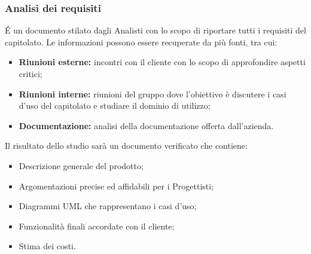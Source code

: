 \subsubsection{Analisi dei requisiti}\label{ProcessiPrimari_Sviluppo_AnalisiRequisiti}
\'E un documento stilato dagli Analisti con lo scopo di riportare tutti i requisiti del capitolato. Le informazioni possono essere recuperate da più fonti, tra cui: 
\begin{itemize}
	\item \textbf{Riunioni esterne:} incontri con il cliente con lo scopo di approfondire aspetti critici;
	\item \textbf{Riunioni interne:} riunioni del gruppo dove l'obiettivo è discutere i casi d'uso del capitolato e studiare il dominio di utilizzo;
	\item \textbf{Documentazione:} analisi della documentazione offerta dall'azienda.
\end{itemize}
Il risultato dello studio sarà un documento verificato che contiene:
\begin{itemize}
	\item Descrizione generale del prodotto;
	\item Argomentazioni precise ed affidabili per i Progettisti;
	\item Diagrammi UML che rappresentano i casi d'uso;
	\item Funzionalità finali accordate con il cliente;
	\item Stima dei costi.      
\end{itemize}

